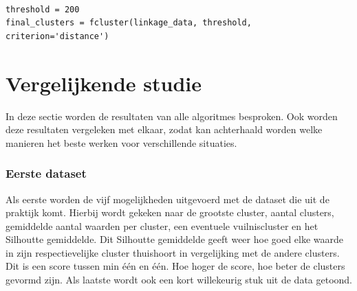 \begin{lstlisting}

threshold = 200
final_clusters = fcluster(linkage_data, threshold, criterion='distance')

\end{lstlisting}



\section{Vergelijkende studie}
In deze sectie worden de resultaten van alle algoritmes besproken. Ook worden deze resultaten vergeleken met elkaar, zodat kan achterhaald worden welke manieren het beste werken voor verschillende situaties.
\newpage
\subsubsection{Eerste dataset}
Als eerste worden de vijf mogelijkheden uitgevoerd met de dataset die uit de praktijk komt. Hierbij wordt gekeken naar de grootste cluster, aantal clusters, gemiddelde aantal waarden per cluster, een eventuele vuilniscluster en het Silhoutte gemiddelde. Dit Silhoutte gemiddelde geeft weer hoe goed elke waarde in zijn respectievelijke cluster thuishoort in vergelijking met de andere clusters. Dit is een score tussen min één en één. Hoe hoger de score, hoe beter de clusters gevormd zijn. Als laatste wordt ook een kort willekeurig stuk uit de data getoond.

